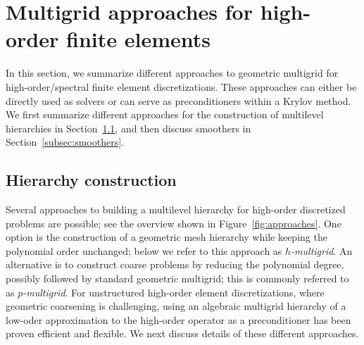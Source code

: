 \documentclass[smallcondensed,final]{svjour3}     %
\begin{document}
\section{Multigrid approaches for high-order finite elements}
\label{sec:approaches}

In this section, we summarize different approaches to geometric
multigrid for high-order/spectral finite element
discretizations. These approaches can either be directly used as
solvers or can serve as preconditioners within a Krylov method. We
first summarize different approaches for the construction of
multilevel hierarchies in Section~\ref{subsec:hierarchy}, and then
discuss smoothers in Section~\ref{subsec:smoothers}.

\subsection{Hierarchy construction}\label{subsec:hierarchy}
Several approaches to building a multilevel hierarchy for high-order
discretized problems are possible; see the overview shown in
Figure~\ref{fig:approaches}. One option is the construction of a
geometric mesh hierarchy while keeping the polynomial order unchanged;
below we refer to this approach as \emph{$h$-multigrid}. An
alternative is to construct coarse problems by reducing the polynomial
degree, possibly followed by standard geometric multigrid; this is
commonly referred to as \emph{$p$-multigrid}. For unstructured
high-order element discretizations, where geometric coarsening is
challenging, using an algebraic multigrid hierarchy of a low-oder
approximation to the high-order operator as a preconditioner has been
proven efficient and flexible. We next discuss details of these
different approaches.
\end{document}
